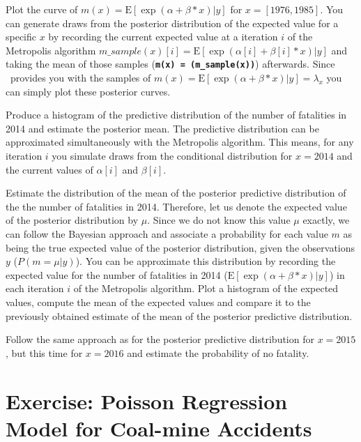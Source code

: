 \documentclass[11pt]{article}
\newcommand{\cl}[1]{{\texttt{\textbf{#1}}}}
\begin{document}
Plot the curve of $m(x) = \text{E}[\exp(\alpha+\beta*x)|y]$ for $x = [1976,1985]$. 
You can generate draws from the posterior distribution of the expected value for a specific $x$ by recording the current expected value at a iteration $i$ of the Metropolis algorithm $m\_sample(x)[i] = \text{E}[\exp(\alpha[i]+\beta[i]*x)|y]$ and taking the mean of those samples (\cl{m(x) = (m\_sample(x))}) afterwards. Since \RevBayes~provides you with the samples of $m(x) = \text{E}[\exp(\alpha+\beta*x)|y] = \lambda_x$ you can simply plot these posterior curves.
 

 
Produce a histogram of the predictive distribution of the number of fatalities in 2014 and estimate the posterior mean. 
The predictive distribution can be approximated simultaneously with the Metropolis algorithm. 
This means, for any iteration $i$ you simulate draws from the conditional distribution for $x = 2014$ and the current values of $\alpha[i]$ and $\beta[i]$.
 
Estimate the distribution of the mean of the posterior predictive distribution of the the number of fatalities in 2014. 
Therefore, let us denote the expected value of the posterior distribution by $\mu$. 
Since we do not know this value $\mu$ exactly, we can follow the Bayesian approach and associate a probability for each value $m$ as being the true expected value of the posterior distribution, given the observations $y$ ($P(m = \mu|y)$).
You can be approximate this distribution by recording the expected value for the number of fatalities in 2014 ($\text{E}[\exp(\alpha+\beta*x)|y]$) in each iteration $i$ of the Metropolis algorithm. 
Plot a histogram of the expected values, compute the mean of the expected values and compare it to the previously obtained estimate of the mean of the posterior predictive distribution.
 
Follow the same approach as for the posterior predictive distribution for $x = 2015$, but this time for $x = 2016$ and estimate the probability of no fatality. 
 
 
 
 

\newpage
\FloatBarrier
\section{Exercise: Poisson Regression Model for Coal-mine Accidents}
 
\end{document}

